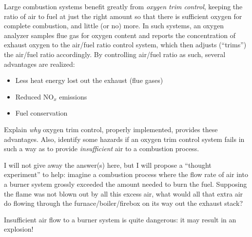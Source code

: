 

Large combustion systems benefit greatly from {\it oxygen trim control}, keeping the ratio of air to fuel at just the right amount so that there is sufficient oxygen for complete combustion, and little (or no) more.  In such systems, an oxygen analyzer samples flue gas for oxygen content and reports the concentration of exhaust oxygen to the air/fuel ratio control system, which then adjusts (``trims'') the air/fuel ratio accordingly.  By controlling air/fuel ratio as such, several advantages are realized:

\begin{itemize}
\item{} Less heat energy lost out the exhaust (flue gases)
\item{} Reduced NO$_{x}$ emissions
\item{} Fuel conservation
\end{itemize}

Explain {\it why} oxygen trim control, properly implemented, provides these advantages.  Also, identify some hazards if an oxygen trim control system fails in such a way as to provide {\it insufficient} air to a combustion process.







I will not give away the answer(s) here, but I will propose a ``thought experiment'' to help: imagine a combustion process where the flow rate of air into a burner system grossly exceeded the amount needed to burn the fuel.  Supposing the flame was not blown out by all this excess air, what would all that extra air do flowing through the furnace/boiler/firebox on its way out the exhaust stack?

\vskip 10pt

Insufficient air flow to a burner system is quite dangerous: it may result in an explosion!











